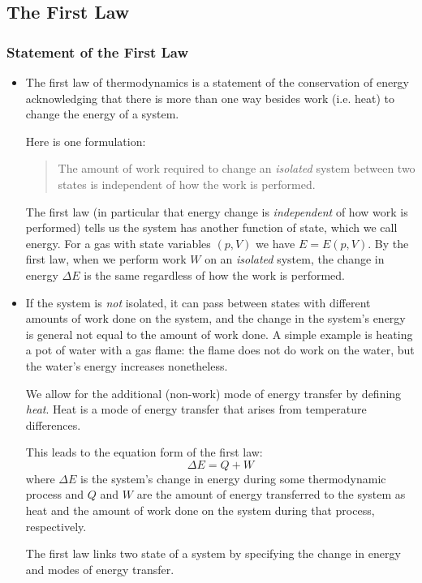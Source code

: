 \documentclass[11pt, a4paper]{article}
\begin{document}
\subsection{The First Law}
\subsubsection{Statement of the First Law}
\begin{itemize}
	\item The first law of thermodynamics is a statement of the conservation of energy acknowledging that there is more than one way besides work (i.e. heat) to change the energy of a system. 
	
	Here is one formulation: 
	\begin{quote}
		The amount of work required to change an \textit{isolated} system between two states is independent of how the work is performed.
	\end{quote}
	The first law (in particular that energy change is \textit{independent} of how work is performed) tells us the system has another function of state, which we call energy. For a gas with state variables $ (p, V) $ we have $ E = E(p, V) $. By the first law, when we perform work $ W $ on an \textit{isolated} system, the change in energy $ \Delta E $ is the same regardless of how the work is performed.
	
	\item If the system is \textit{not} isolated, it can pass between states with different amounts of work done on the system, and the change in the system's energy is general not equal to the amount of work done. A simple example is heating a pot of water with a gas flame: the flame does not do work on the water, but the water's energy increases nonetheless.  
	
	We allow for the additional (non-work) mode of energy transfer by defining \textit{heat}. Heat is a mode of energy transfer that arises from temperature differences.  
	
	This leads to the equation form of the first law:
	\begin{equation*}
		\Delta E = Q + W
	\end{equation*}
	where $ \Delta E $ is the system's change in energy during some thermodynamic process and $ Q $ and $ W $ are the amount of energy transferred to the system as heat and the amount of work done on the system during that process, respectively.
	
	The first law links two state of a system by specifying the change in energy and modes of energy transfer. 
	

\end{itemize}
\end{document}
